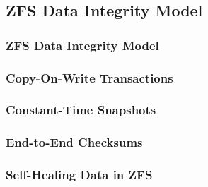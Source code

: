 \subsection{ZFS Data Integrity Model} %
\begin{frame}[fragile]
    \frametitle{ZFS Data Integrity Model}
\end{frame}
% 
% 
% 
% 
% 
\begin{frame}[fragile]
    \frametitle{Copy-On-Write Transactions}
\end{frame}
% 
% 
\begin{frame}[fragile]
    \frametitle{Constant-Time Snapshots}
\end{frame}
% 
% 
% 
% 
% 
% 
% 
\begin{frame}[fragile]
    \frametitle{End-to-End Checksums}
\end{frame}
% 
% 
\begin{frame}[fragile]
    \frametitle{Self-Healing Data in ZFS}
\end{frame}
